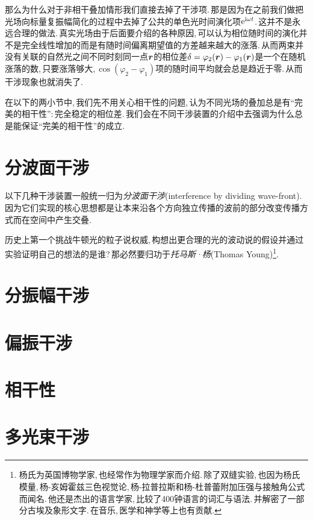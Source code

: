 那么为什么对于非相干叠加情形我们直接去掉了干涉项.\,那是因为在之前我们做把光场向标量复振幅简化的过程中去掉了公共的单色光时间演化项${\rm e} ^{{\rm i} \omega t}$.\,这并不是永远合理的做法.\,真实光场由于后面要介绍的各种原因,\,可以认为相位随时间的演化并不是完全线性增加的而是有随时间偏离期望值的方差越来越大的涨落.\,从而两束并没有关联的自然光之间不同时刻同一点$\boldsymbol{r}$的相位差$\delta=\varphi_2(\boldsymbol{r})-\varphi_1(\boldsymbol{r})$是一个在随机涨落的数,\,只要涨落够大,\,$\cos (\varphi_2-\varphi_1)$项的随时间平均就会总是趋近于零.\,从而干涉现象也就消失了.

在以下的两小节中,\,我们先不用关心相干性的问题,\,认为不同光场的叠加总是有``完美的相干性'':\,完全稳定的相位差.\,我们会在不同干涉装置的介绍中去强调为什么总是能保证``完美的相干性''的成立.




\section{分波面干涉}

以下几种干涉装置一般统一归为\emph{分波面干涉}(interference by dividing wave-front).\,因为它们实现的核心思想都是让本来沿各个方向独立传播的波前的部分改变传播方式而在空间中产生交叠.


历史上第一个挑战牛顿光的粒子说权威,\,构想出更合理的光的波动说的假设并通过实验证明自己的想法的是谁?\,那必然要归功于\emph{托马斯·杨}(Thomas Young)\footnote{杨氏为英国博物学家,\,也经常作为物理学家而介绍.\,除了双缝实验,\,也因为杨氏模量,\,杨-亥姆霍兹三色视觉论,\,杨-拉普拉斯和杨-杜普蕾附加压强与接触角公式而闻名.\,他还是杰出的语言学家,\,比较了400钟语言的词汇与语法.\,并解密了一部分古埃及象形文字.\,在音乐,\,医学和神学等上也有贡献.}.\,

\section{分振幅干涉}

\section{偏振干涉}

\section{相干性}

\section{多光束干涉}

